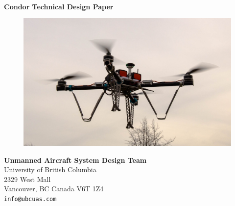 
\begin{titlepage}
   \begin{center}
       \vspace*{0.5cm}

       \color{black}{\huge 2019 AUVSI SUAS Competition }\\
       \vspace{0.2cm}
       \color{light_blue}\textbf{ \Huge Condor Technical Design Paper} \\
 
      \vspace{0.5cm}
      
        \begin{figure}[h]
        \includegraphics[width=\linewidth]{figures/CondorMaiden.jpg}
        \end{figure}
        
        \vspace{0.5cm}
       \color{normal_blue}\textbf{Unmanned Aircraft System Design Team} \\
        \color{black}
        University of British Columbia\\
        2329 West Mall \\
        Vancouver, BC Canada V6T 1Z4 \\
        \texttt{info@ubcuas.com}


        \vspace{0.5cm}

        
        
        \vfill
   \end{center}
\end{titlepage}
\twocolumn
\endinput